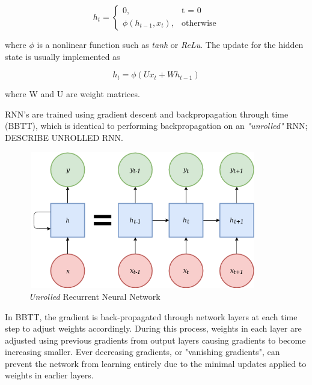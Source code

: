 \begin{equation}
	h_{t}=
	\begin{cases}
	 0, & \text{t = 0} \\
	 \phi{(h_{t-1}, x_{t})}, & \text{otherwise}
	\end{cases}
\end{equation}

\noindent
where $\phi$ is a nonlinear function such as \textit{tanh} or \textit{ReLu}. The update for the hidden state is usually implemented as 

\begin{equation}
h_{t} = \phi{(Ux_{t} + Wh_{t-1})}
\end{equation}

\noindent
where W and U are weight matrices.

\par
\noindent
\newline
RNN's are trained using gradient descent and backpropagation through time (BBTT), which is identical to performing backpropagation on an \textit{"unrolled"} RNN; DESCRIBE UNROLLED RNN.

\begin{figure}[h]
	\includegraphics[width=10cm, height=6cm]{./figures/fig3}
	\centering
	\caption{\textit{Unrolled} Recurrent Neural Network}
	\label{fig:fig3}
\end{figure}

\par
\noindent
\newline
In BBTT, the gradient is back-propagated through network layers at each time step to adjust weights accordingly. During this process, weights in each layer are adjusted using previous gradients from output layers causing gradients to become increasing smaller. Ever decreasing gradients, or "vanishing gradients", can prevent the network from learning entirely due to the minimal updates applied to weights in earlier layers.

